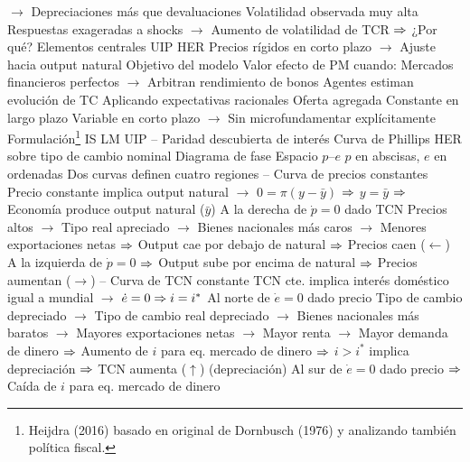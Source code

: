 \documentclass{nuevotema}
\begin{document}
\begin{esquemal}
				\4[] $\to$ Depreciaciones más que devaluaciones
				\4 Volatilidad observada muy alta
				\4[] Respuestas exageradas a shocks
				\4[] $\to$ Aumento de volatilidad de TCR
				\4[] $\Rightarrow$ ¿Por qué?
				\4 Elementos centrales
				\4[] UIP
				\4[] HER
				\4[] Precios rígidos en corto plazo
				\4[] $\to$ Ajuste hacia output natural
			\3 Objetivo del modelo
				\4 Valor efecto de PM cuando:
				\4[] Mercados financieros perfectos
				\4[] $\to$ Arbitran rendimiento de bonos
				\4 Agentes estiman evolución de TC
				\4[] Aplicando expectativas racionales
				\4 Oferta agregada
				\4[] Constante en largo plazo
				\4[] Variable en corto plazo
				\4[] $\to$ Sin microfundamentar explícitamente
		\2 Formulación\footnote{Heijdra (2016) basado en original de Dornbusch (1976) y analizando también política fiscal.}
			\3 IS
				\4[] 
			\3 LM
				\4[] 
			\3 UIP -- Paridad descubierta de interés
				\4[] 
			\3 Curva de Phillips
				\4[] 
			\3 HER sobre tipo de cambio nominal
				\4[] 
			\3 Diagrama de fase
				\4 Espacio $p$--$e$
				\4[] $p$ en abscisas, $e$ en ordenadas
				\4 Dos curvas definen cuatro regiones
				\4[$\dot{p}=0$] -- Curva de precios constantes
				\4[] Precio constante implica output natural
				\4[] $\to$ $0=\pi(y-\bar{y})$ $\Rightarrow$ $y=\bar{y}$
				\4[] $\Rightarrow$ Economía produce output natural ($\bar{y}$)
				\4 A la derecha de $\dot{p} = 0$ dado TCN
				\4[] Precios altos
				\4[] $\to$ Tipo real apreciado
				\4[] $\to$ Bienes nacionales más caros
				\4[] $\to$ Menores exportaciones netas
				\4[] $\Rightarrow$ Output cae por debajo de natural
				\4[] $\Rightarrow$ Precios caen ($\leftarrow$)
				\4 A la izquierda de $\dot{p} = 0$
				\4[] $\Rightarrow$ Output sube por encima de natural
				\4[] $\Rightarrow$ Precios aumentan ($\rightarrow$)
				\4[$\dot{e} = 0$] -- Curva de TCN constante
				\4[] TCN cte. implica interés doméstico igual a mundial
				\4[] $\to$ $\dot{e}=0 \Rightarrow i = i^*$
				\4 Al norte de $\dot{e}=0$ dado precio
				\4[] Tipo de cambio depreciado
				\4[] $\to$ Tipo de cambio real depreciado
				\4[] $\to$ Bienes nacionales más baratos
				\4[] $\to$ Mayores exportaciones netas
				\4[] $\to$ Mayor renta
				\4[] $\to$ Mayor demanda de dinero
				\4[] $\Rightarrow$ Aumento de $i$ para eq. mercado de dinero
				\4[] $\Rightarrow$ $i > i^*$ implica depreciación
				\4[] $\Rightarrow$ TCN aumenta ($\uparrow$) (depreciación)
				\4 Al sur de $\dot{e}=0$ dado precio
				\4[] $\Rightarrow$ Caída de $i$ para eq. mercado de dinero

\end{esquemal}
\end{document}

